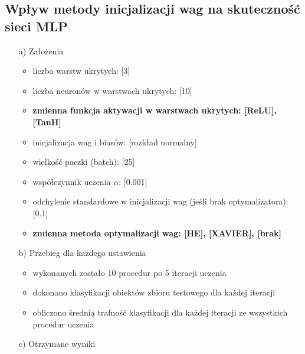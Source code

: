 \documentclass[17pt]{article}
\begin{document}
\newpage

\subsection{Wpływ metody inicjalizacji wag na skuteczność sieci MLP}
\vspace{4mm}
\begin{enumerate}

\item[a)] Założenia

\begin{itemize}
\item liczba warstw ukrytych: [3]
\item liczba neuronów w warstwach ukrytych: [10]
\item \textbf{zmienna funkcja aktywacji w warstwach ukrytych: [ReLU], [TanH]}
\item inicjalizacja wag i biasów: [rozkład normalny]
\item wielkość paczki (batch): [25]
\item współczynnik uczenia $\alpha$: [0.001]
\item odchylenie standardowe w inicjalizacji wag (jeśli brak optymalizatora): [0.1]
\item \textbf{zmienna metoda optymalizacji wag: 
[HE], [XAVIER], [brak]}
\end{itemize}

\item[b)] Przebieg dla każdego ustawienia

\begin{itemize}
\item wykonanych zostało 10 procedur po 5 iteracji uczenia
\item dokonano klasyfikacji obiektów zbioru testowego dla każdej iteracji
\item obliczono średnią trafność klasyfikacji dla każdej iteracji ze wszystkich procedur uczenia
\end{itemize}
\item[c)] Otrzymane wyniki


\end{enumerate}
\end{document}
